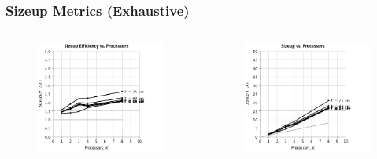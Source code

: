 \documentclass[handout]{beamer}
\begin{document}
\begin{frame}
	\frametitle{Sizeup Metrics (Exhaustive)}
\begin{columns}
	\vspace{-1em}
	\begin{figure}
	\centering
	\includegraphics[scale = 0.25]{ge_size_1.png}
	\end{figure}
	\vspace{-2em}
	\begin{figure}
	\centering
	\includegraphics[scale = 0.25]{ge_size_2.png}
	\end{figure}
\begin{minipage}[c][.6\textheight][c]{\linewidth}
	\vspace{-1em}

\end{minipage}
\end{columns}
\end{frame}
\end{document}
